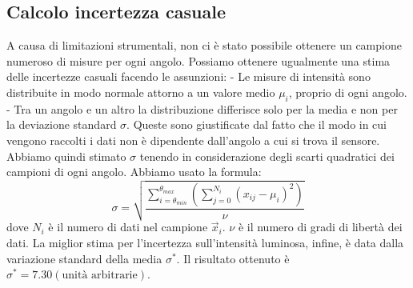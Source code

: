 \subsection{Calcolo incertezza casuale}\label{subsec:calcolo-incertezza-casuale}
  A causa di limitazioni strumentali, non ci è stato possibile ottenere un campione
  numeroso di misure per ogni angolo. Possiamo ottenere ugualmente
  una stima delle incertezze casuali facendo le assunzioni: %
  - Le misure di intensità sono distribuite in modo normale attorno a un valore
    medio $\mu_i$, proprio di ogni angolo.
  - Tra un angolo e un altro la distribuzione differisce solo per la media e non per la
    deviazione standard $\sigma$.
  Queste sono giustificate dal fatto che il modo in cui vengono raccolti i dati
  non è dipendente dall'angolo a cui si trova il sensore.
  Abbiamo quindi stimato $\sigma$ tenendo in considerazione degli scarti quadratici
  dei campioni di ogni angolo.
  Abbiamo usato la formula:
  \begin{equation}
    \sigma = \sqrt{
      \frac {
        \sum_{i = \theta_{min}}^{\theta_{max}} \left(
          \sum_{j = 0}^{N_i} (x_{ij} -\mu_i)^2
        \right)
      } {
        \nu
      }
    }
  \end{equation}
  \noindent dove $N_i$ è il numero di dati nel campione $\vec{x}_i$.
  $\nu$ è il numero di gradi di libertà dei dati. La miglior stima per l'incertezza
  sull'intensità luminosa, infine, è data dalla variazione standard della media $\sigma^*$.
  Il risultato ottenuto è $\sigma^* = 7.30 (\text{unità arbitrarie})$.
\endinput

